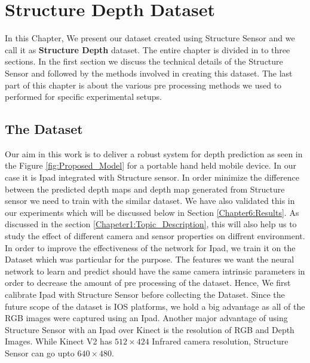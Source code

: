 

\chapter{Structure Depth Dataset}

\label{Chapter4:Dataset} 


In this Chapter, We present our dataset created using Structure Sensor and we call it as \textbf{Structure Depth} dataset. The entire chapter is divided in to three sections. In the first section we discuss the technical details of the Structure Sensor and followed by the methods involved in creating this dataset. The last part of this chapter is about the various pre processing methods we used to performed for specific experimental setups.


\section{The Dataset} 

Our aim in this work is to deliver a robust system for depth prediction as seen in the Figure \ref{fig:Proposed_Model} for a portable hand held mobile device. In our case it is Ipad integrated with Structure sensor. In order minimize the difference between the predicted depth maps and depth map generated from Structure sensor we need to train with the similar dataset. We have also validated this in our experiments which will be discussed below in Section \ref{Chapter6:Results}. As discussed in the section \ref{Chapeter1:Topic_Description}, this will also help us to study the effect of different camera and sensor properties on diffrent environment.\\

In order to improve the effectiveness of the network for Ipad, we train it on the Dataset which was particular for the purpose. The features we want the neural network to learn and predict should have the same camera intrinsic parameters in order to decrease the amount of pre processing of the dataset. Hence, We first calibrate Ipad with Structure Sensor before collecting the Dataset. Since the future scope of the dataset is IOS platforms, we hold a big advantage as all of the RGB images were captured using an Ipad. Another major advantage of using Structure Sensor with an Ipad over Kinect is the resolution of RGB and Depth Images. While Kinect V2 has $512\times424$ Infrared camera resolution, Structure Sensor can go upto $640\times480$. \\

